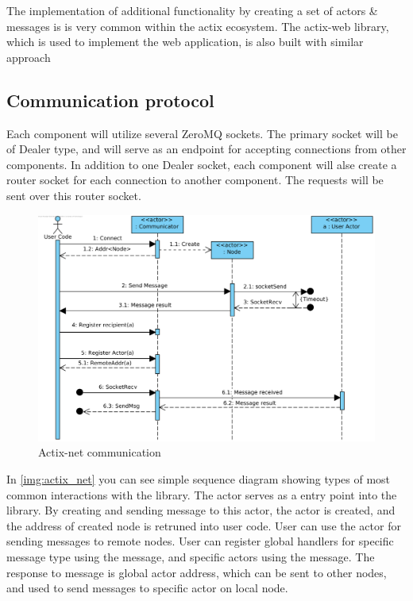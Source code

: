 The implementation of additional functionality by creating a set of actors \& messages is is very common within the actix ecosystem.
The actix-web library, which is used to implement the web application, is also built with similar approach

\subsection{Communication protocol}
Each component will utilize several ZeroMQ sockets. The primary socket will be of Dealer type, and will serve as an endpoint
for accepting connections from other components. In addition to one Dealer socket, each component will alse create a router
socket for each connection to another component. The requests will be sent over this router socket.

\begin{figure}[H]
    \includegraphics[width=\textwidth]{obrazky-figures/Actix-net communication.png}
    \caption{Actix-net communication}
    \label{img:actix_net}
\end{figure}
In \autoref{img:actix_net} you can see simple sequence diagram showing types of most common interactions with the library. The 
actor serves as a entry point into the library. By creating and sending  message to this actor, the  actor is created,
and the address of created node is retruned into user code. User can use the  actor for sending messages to
remote nodes. User can register global handlers for specific message type
using the  message, and specific actors using the  message. The response to 
message is global actor address, which can be sent to other nodes, and used to send messages to specific actor on local node.

